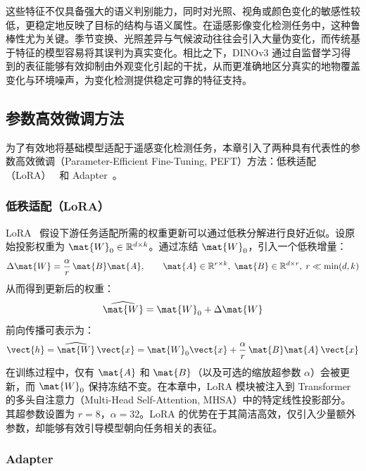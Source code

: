 这些特征不仅具备强大的语义判别能力，同时对光照、视角或颜色变化的敏感性较低，更稳定地反映了目标的结构与语义属性。在遥感影像变化检测任务中，这种鲁棒性尤为关键。季节变换、光照差异与气候波动往往会引入大量伪变化，而传统基于特征的模型容易将其误判为真实变化。相比之下，DINOv3 通过自监督学习得到的表征能够有效抑制由外观变化引起的干扰，从而更准确地区分真实的地物覆盖变化与环境噪声，为变化检测提供稳定可靠的特征支持。


\subsection{参数高效微调方法}

为了有效地将基础模型适配于遥感变化检测任务，本章引入了两种具有代表性的参数高效微调（Parameter-Efficient Fine-Tuning, PEFT）方法：低秩适配（LoRA）~\cite{LORA} 和 Adapter~\cite{adapter}。

\subsubsection{低秩适配（LoRA）}

LoRA~\cite{LORA} 假设下游任务适配所需的权重更新可以通过低秩分解进行良好近似。设原始投影权重为 $\mat{W}_0\in\mathbb{R}^{d\times k}$。通过冻结 $\mat{W}_0$，引入一个低秩增量：
\begin{equation}
\Delta \mat{W}=\frac{\alpha}{r}\,\mat{B}\mat{A},\qquad
\mat{A}\in\mathbb{R}^{r\times k},\;\mat{B}\in\mathbb{R}^{d\times r},\;r\ll\min(d,k)
\end{equation}
从而得到更新后的权重：
\begin{equation}
\widehat{\mat{W}}=\mat{W}_0+\Delta \mat{W}
\end{equation}
前向传播可表示为：
\begin{equation}
\vect{h}=\widehat{\mat{W}}\,\vect{x}
=\mat{W}_0\vect{x}+\frac{\alpha}{r}\,\mat{B}\mat{A}\,\vect{x}
\end{equation}
在训练过程中，仅有 $\mat{A}$ 和 $\mat{B}$（以及可选的缩放超参数 $\alpha$）会被更新，而 $\mat{W}_0$ 保持冻结不变。在本章中，LoRA 模块被注入到 Transformer 的多头自注意力（Multi-Head Self-Attention, MHSA）中的特定线性投影部分。其超参数设置为 $r{=}8$，$\alpha{=}32$。LoRA 的优势在于其简洁高效，仅引入少量额外参数，却能够有效引导模型朝向任务相关的表征。

\subsubsection{Adapter}


